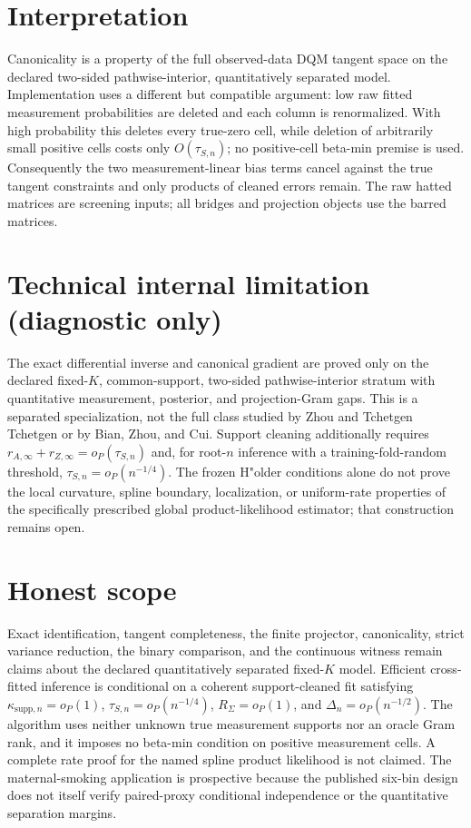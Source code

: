 \documentclass{article}
\begin{document}
\section{Interpretation}

Canonicality is a property of the full observed-data DQM tangent space on the declared two-sided pathwise-interior, quantitatively separated model.  Implementation uses a different but compatible argument: low raw fitted measurement probabilities are deleted and each column is renormalized.  With high probability this deletes every true-zero cell, while deletion of arbitrarily small positive cells costs only \(O(\tau_{S,n})\); no positive-cell beta-min premise is used.  Consequently the two measurement-linear bias terms cancel against the true tangent constraints and only products of cleaned errors remain.  The raw hatted matrices are screening inputs; all bridges and projection objects use the barred matrices.

\section*{Technical internal limitation (diagnostic only)}

The exact differential inverse and canonical gradient are proved only on the declared fixed-\(K\), common-support, two-sided pathwise-interior stratum with quantitative measurement, posterior, and projection-Gram gaps.  This is a separated specialization, not the full class studied by Zhou and Tchetgen Tchetgen or by Bian, Zhou, and Cui.  Support cleaning additionally requires \(r_{A,\infty}+r_{Z,\infty}=o_P(\tau_{S,n})\) and, for root-\(n\) inference with a training-fold-random threshold, \(\tau_{S,n}=o_P(n^{-1/4})\).  The frozen H"older conditions alone do not prove the local curvature, spline boundary, localization, or uniform-rate properties of the specifically prescribed global product-likelihood estimator; that construction remains open.

\section{Honest scope}

Exact identification, tangent completeness, the finite projector, canonicality, strict variance reduction, the binary comparison, and the continuous witness remain claims about the declared quantitatively separated fixed-\(K\) model.  Efficient cross-fitted inference is conditional on a coherent support-cleaned fit satisfying \(\kappa_{\mathrm{supp},n}=o_P(1)\), \(\tau_{S,n}=o_P(n^{-1/4})\), \(R_\Sigma=o_P(1)\), and \(\Delta_n=o_P(n^{-1/2})\).  The algorithm uses neither unknown true measurement supports nor an oracle Gram rank, and it imposes no beta-min condition on positive measurement cells.  A complete rate proof for the named spline product likelihood is not claimed.  The maternal-smoking application is prospective because the published six-bin design does not itself verify paired-proxy conditional independence or the quantitative separation margins.
\end{document}
